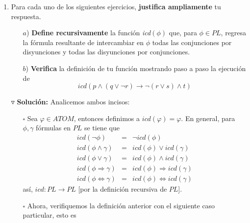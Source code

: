 \documentclass{article}
\begin{document}
\begin{enumerate}
\begin{itemize}
\begin{proof}
\begin{itemize}
\begin{eqnarray*}
        &=& con(\phi \Leftrightarrow \gamma) + 1
        \hspace*{3.3cm} \text{Definición de ``\textit{con}''.}
      \end{eqnarray*}
      \[
      \therefore \; atom(\phi \Leftrightarrow \gamma) \leq con(\phi \Leftrightarrow \gamma) + 1
      \]
    \end{itemize}
  \end{proof}
  \end{itemize}
%
\hfill $\lhd$
\item Para cada uno de los siguientes ejercicios, \textbf{justifica ampliamente}
  tu respuesta.
  \begin{itemize}
  \item[$a$)] \textbf{Define recursivamente} la función \textit{icd}$(\phi)$ que,
    para $\phi \in PL$, regresa la fórmula resultante de intercambiar en $\phi$
    todas las conjunciones por disyunciones y todas las disyunciones por conjunciones.
  \item[$b$)] \textbf{Verifica} la definición de tu función mostrando paso a paso
    la ejecución de
    \[
    icd(p \land (q \lor \neg r) \rightarrow \neg (r \lor s) \land t)
    \]
  \end{itemize}
  $\triangledown$ \textbf{Solución:}
  Analicemos ambos incisos:
  \begin{itemize}
  \item[$\square$] Sea $\varphi \in ATOM$, entonces definimos a $icd(\varphi) = \varphi$. En
    general, para $\phi, \gamma$ fórmulas en $PL$ se tiene que
    \begin{eqnarray*}
      icd(\neg \phi) &=& \neg icd(\phi)\\
      icd(\phi \land \gamma) &=& icd(\phi) \lor icd(\gamma)\\
      icd(\phi \lor \gamma) &=& icd(\phi) \land icd(\gamma)\\
      icd(\phi \Rightarrow \gamma) &=& icd(\phi) \Rightarrow icd(\gamma)\\
      icd(\phi \Leftrightarrow \gamma) &=& icd(\phi) \Leftrightarrow icd(\gamma)
    \end{eqnarray*}
    así, $icd: PL \rightarrow PL$ [por la definición recursiva de $PL$].
  \item[$\square$] Ahora, verifiquemos la definición anterior con el siguiente
    caso particular, esto es

\end{itemize}
\end{enumerate}
\end{document}
